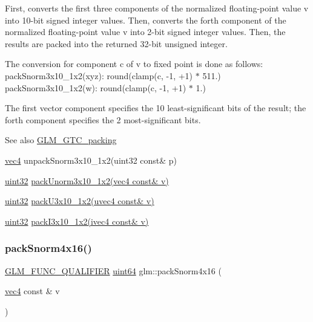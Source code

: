 First, converts the first three components of the normalized floating-\/point value v into 10-\/bit signed integer values. Then, converts the forth component of the normalized floating-\/point value v into 2-\/bit signed integer values. Then, the results are packed into the returned 32-\/bit unsigned integer.

The conversion for component c of v to fixed point is done as follows\+: pack\+Snorm3x10\+\_\+1x2(xyz)\+: round(clamp(c, -\/1, +1) $\ast$ 511.) pack\+Snorm3x10\+\_\+1x2(w)\+: round(clamp(c, -\/1, +1) $\ast$ 1.)

The first vector component specifies the 10 least-\/significant bits of the result; the forth component specifies the 2 most-\/significant bits.

\begin{DoxySeeAlso}{See also}
\hyperlink{group__gtc__packing}{G\+L\+M\+\_\+\+G\+T\+C\+\_\+packing} 

\hyperlink{group__core__types_ga5881b1b022d7fd1b7218f5916532dd02}{vec4} unpack\+Snorm3x10\+\_\+1x2(uint32 const\& p) 

\hyperlink{group__gtc__type__precision_ga202b6a53c105fcb7e531f9b443518451}{uint32} \hyperlink{group__gtc__packing_ga2cf2d11b40bd48639110456fd74c2e33}{pack\+Unorm3x10\+\_\+1x2(vec4 const\& v)} 

\hyperlink{group__gtc__type__precision_ga202b6a53c105fcb7e531f9b443518451}{uint32} \hyperlink{group__gtc__packing_gaf656d8862628f96b20de7a36eaa1fe56}{pack\+U3x10\+\_\+1x2(uvec4 const\& v)} 

\hyperlink{group__gtc__type__precision_ga202b6a53c105fcb7e531f9b443518451}{uint32} \hyperlink{group__gtc__packing_ga032e18fa5bc5b8f3897104aeb2f1e195}{pack\+I3x10\+\_\+1x2(ivec4 const\& v)} 
\end{DoxySeeAlso}
\mbox{\label{group__gtc__packing_ga9b237d7c66b7a71964e6d1f4dc06539f}} 
\subsubsection{\texorpdfstring{pack\+Snorm4x16()}{packSnorm4x16()}}
{\footnotesize\ttfamily \hyperlink{setup_8hpp_a33fdea6f91c5f834105f7415e2a64407}{G\+L\+M\+\_\+\+F\+U\+N\+C\+\_\+\+Q\+U\+A\+L\+I\+F\+I\+ER} \hyperlink{group__gtc__type__precision_gae3632bf9b37da66233d78930dd06378a}{uint64} glm\+::pack\+Snorm4x16 (\begin{DoxyParamCaption}\item[{\hyperlink{group__core__types_ga5881b1b022d7fd1b7218f5916532dd02}{vec4} const \&}]{v }\end{DoxyParamCaption})}

